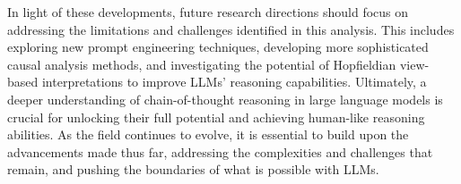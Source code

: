 \documentclass[conference]{IEEEtran}
\begin{document}
In light of these developments, future research directions should focus on addressing the limitations and challenges identified in this analysis. This includes exploring new prompt engineering techniques, developing more sophisticated causal analysis methods, and investigating the potential of Hopfieldian view-based interpretations to improve LLMs' reasoning capabilities. Ultimately, a deeper understanding of chain-of-thought reasoning in large language models is crucial for unlocking their full potential and achieving human-like reasoning abilities. As the field continues to evolve, it is essential to build upon the advancements made thus far, addressing the complexities and challenges that remain, and pushing the boundaries of what is possible with LLMs.
\end{document}
